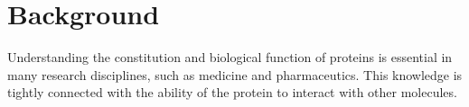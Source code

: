 \documentclass{bmcart}
\begin{document}
\begin{frontmatter}
\begin{abstractbox}
\begin{keyword}
\end{keyword}


\end{abstractbox}
%

\end{frontmatter}



\section*{Background}
Understanding the constitution and biological function of proteins is essential in many research disciplines, such as medicine and pharmaceutics.
This knowledge is tightly connected with the ability of the protein to interact with other molecules.
\end{document}

